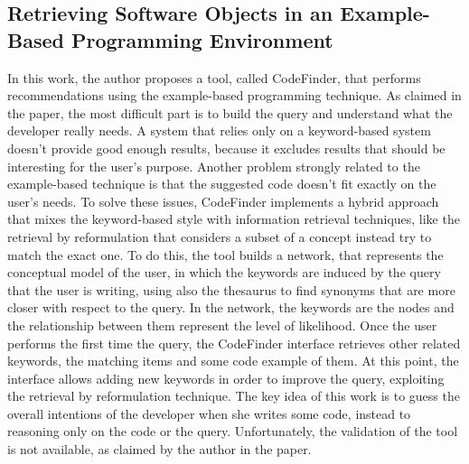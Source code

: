 \subsection{Retrieving Software Objects in an Example-Based Programming Environment}
In this work, the author proposes a tool, called CodeFinder, that performs recommendations using the example-based programming technique. As claimed in the paper, the most difficult part is to build the query and understand what the developer really needs. A system that relies only on a keyword-based system doesn't provide good enough results, because it excludes results that should be interesting for the user's purpose. Another problem strongly related to the example-based technique is that the suggested code doesn't fit exactly on the user's needs. To solve these issues, CodeFinder implements a hybrid approach that mixes the keyword-based style with information retrieval techniques, like the retrieval by reformulation that considers a subset of a concept instead try to match the exact one. To do this, the tool builds a network, that represents the conceptual model of the user, in which the keywords are induced by the query that the user is writing, using also the thesaurus to find synonyms that are more closer with respect to the query.  In the network, the keywords are the nodes and the relationship between them represent the level of likelihood. Once the user performs the first time the query, the CodeFinder interface retrieves other related keywords, the matching items and some code example of them. At this point, the interface allows adding new keywords in order to improve the query, exploiting the retrieval by reformulation technique. The key idea of this work is to guess the overall intentions of the developer when she writes some code, instead to reasoning only on the code or the query. Unfortunately, the validation of the tool is not available, as claimed by the author in the paper.

